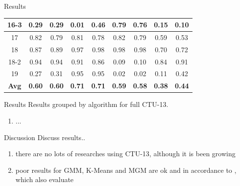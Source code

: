 \documentclass[newPxFont, numfooter, sectionpages]{beamer}
\begin{document}
\begin{frame}[c]{Results}
\begin{table}[h!]
\begin{tabular}{ c|c c|c c|c c|c c }
			16-3 & 0.29 & 0.29 & 0.01 & 0.46 &\color{red} 0.79 & 0.76 & 0.15 & 0.10 \\ \hline
			17 &\color{red} 0.82 & 0.79 &\color{red} 0.81 & 0.78 &\color{red} 0.82 & 0.79 & 0.59 & 0.53 \\ \hline
			18 & 0.87 & 0.89 & 0.97 &\color{red} 0.98 &\color{red} 0.98 &\color{red} 0.98 & 0.70 & 0.72 \\ \hline
			18-2 &\color{red} 0.94 &\color{red} 0.94 &\color{red} 0.91 & 0.86 & 0.09 & 0.10 & 0.84 & 0.91 \\ \hline
			19 & 0.27 & 0.31 &\color{red} 0.95 &\color{red} 0.95 & 0.02 & 0.02 & 0.11 & 0.42 \\ \hline
			\rowcolor{Gray} \textbf{Avg} & \textbf{0.60} & \textbf{0.60} &\color{red} \textbf{0.71} &\color{red} \textbf{0.71} & \textbf{0.59} & \textbf{0.58} & \textbf{0.38} & \textbf{0.44} \\
	    \bottomrule
	  \end{tabular}
	\end{table}
\end{frame}

\begin{frame}[c]{Results}
	Results grouped by algorithm for full CTU-13.
	\begin{enumerate}
		\item ...
	\end{enumerate}
\end{frame}

\begin{frame}[c]{Discussion}
	Discuss results..
	\begin{enumerate}
		\item there are no lots of researches using CTU-13, although it is been growing
		\item poor results for GMM, K-Means and MGM are ok and in accordance to \cite{wang2017botnet}, which also evaluate \cite{gu2007bothunter}
	\end{enumerate}
\end{frame}

\end{document}
